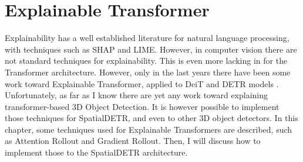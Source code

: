 \chapter{Explainable Transformer}
Explainability has a well established literature for natural language processing, with techniques such as SHAP and LIME. However, in computer vision there are not standard techniques for explainability. This is even more lacking in for the Transformer architecture. 
However, only in the last years there have been some work toward Explainable Transformer, applied to DeiT and DETR models \cite{touvron2021training} \cite{chefer2021transformer} \cite{chefer2021generic}. Unfortunately, as far as I know there are yet any work toward explaining transformer-based 3D Object Detection.
It is however possible to implement those techniques for SpatialDETR, and even to other 3D object detectors. 
In this chapter, some techniques used for Explainable Transformers are described, such as Attention Rollout and Gradient Rollout. Then, I will discuss how to implement those to the SpatialDETR architecture.  
